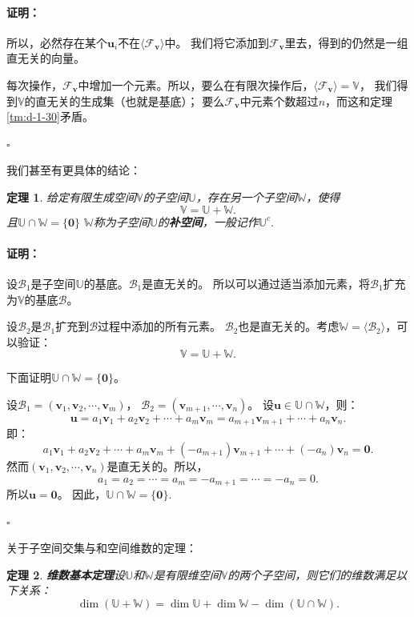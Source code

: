 \documentclass[12pt,UTF8]{ctexbook}
\renewenvironment{proof}{\paragraph{\textbf{证明：}}}{\hfill$\square$}
\newtheorem{tm}{定理}[section]
\begin{document}
\begin{appendix}
\begin{proof}
    所以，必然存在某个$\mathbf{u}_i$不在$\langle\mathcal{F}_{\mathbf{v}}\rangle$中。
    我们将它添加到$\mathcal{F}_{\mathbf{v}}$里去，得到的仍然是一组直无关的向量。

    每次操作，$\mathcal{F}_{\mathbf{v}}$中增加一个元素。所以，要么在有限次操作后，$\langle\mathcal{F}_{\mathbf{v}}\rangle = \mathbb{V}$，
    我们得到$\mathbb{V}$的直无关的生成集（也就是基底）；
    要么$\mathcal{F}_{\mathbf{v}}$中元素个数超过$n$，而这和定理\ref{tm:d-1-30}矛盾。

\end{proof}

我们甚至有更具体的结论：
\begin{tm}\label{tm:d-1-70}
    给定有限生成空间$\mathbb{V}$的子空间$\mathbb{U}$，存在另一个子空间$\mathbb{W}$，使得
    $$ \mathbb{V} = \mathbb{U} + \mathbb{W}.$$
    且$\mathbb{U} \cap \mathbb{W} = \{\mathbf{0}\}$
    $\mathbb{W}$称为子空间$\mathbb{U}$的\textbf{补空间}，一般记作$\mathbb{U}^c.$
\end{tm}

\begin{proof}
    设$\mathcal{B}_1$是子空间$\mathbb{U}$的基底。$\mathcal{B}_1$是直无关的。
    所以可以通过适当添加元素，将$\mathcal{B}_1$扩充为$\mathbb{V}$的基底$\mathcal{B}$。

    设$\mathcal{B}_2$是$\mathcal{B}_1$扩充到$\mathcal{B}$过程中添加的所有元素。
    $\mathcal{B}_2$也是直无关的。考虑$\mathbb{W} = \langle\mathcal{B}_2\rangle$，可以验证：
    $$ \mathbb{V} = \mathbb{U} + \mathbb{W}.$$

    下面证明$ \mathbb{U} \cap \mathbb{W} = \{\mathbf{0}\}$。

    设$\mathcal{B}_1 = (\mathbf{v}_1, \mathbf{v}_2, \cdots , \mathbf{v}_m )$，
    $\mathcal{B}_2 = (\mathbf{v}_{m+1}, \cdots , \mathbf{v}_n )$。 
    设$ \mathbf{u} \in \mathbb{U} \cap \mathbb{W}$，则：
    $$ \mathbf{u} = a_1\mathbf{v}_1 + a_2\mathbf{v}_2 + \cdots + a_m\mathbf{v}_m = a_{m+1}\mathbf{v}_{m+1} + \cdots + a_n\mathbf{v}_n. $$
    即：
    $$a_1\mathbf{v}_1 + a_2\mathbf{v}_2 + \cdots + a_m\mathbf{v}_m + (-a_{m+1})\mathbf{v}_{m+1} + \cdots + (-a_{n})\mathbf{v}_{n} = \mathbf{0}. $$
    然而$(\mathbf{v}_1, \mathbf{v}_2, \cdots , \mathbf{v}_n )$是直无关的。所以，
    $$ a_1 = a_2 = \cdots = a_m = -a_{m+1} = \cdots = -a_n = 0.$$
    所以$\mathbf{u} = \mathbf{0}$。
    因此，$ \mathbb{U} \cap \mathbb{W} = \{\mathbf{0}\}$.

\end{proof}

关于子空间交集与和空间维数的定理：
\begin{tm}{\textbf{维数基本定理}}\label{tm:d-1-80}
    设$\mathbb{U}$和$\mathbb{W}$是有限维空间$\mathbb{V}$的两个子空间，则它们的维数满足以下关系：
    $$ \dim (\mathbb{U} + \mathbb{W}) = \dim \mathbb{U} + \dim \mathbb{W} - \dim (\mathbb{U} \cap \mathbb{W}).$$
\end{tm}


\end{appendix}
\end{document}
